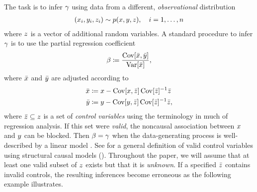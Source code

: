 The task is to infer $\gamma$ using data from a different, \emph{observational} distribution
\begin{align}
\label{eq:dataGeneratingProcess}    
 (x_i, y_i, z_i) \sim p(x, y, z),\quad i=1, \dots, n 
\end{align}
where $z$ is a vector of additional random variables. A standard procedure to infer $\gamma$ is to use the partial regression coefficient
\begin{equation} \label{eq:partial_regression_coeff}
    \begin{split}
    \beta \coloneqq  \frac{\operatorname*{Cov}[\bar{x},  \bar{y}]}{\text{Var}[\bar{x}]},
    \end{split}
\end{equation}
where $\bar{x}$ and $\bar{y}$ are adjusted according to 
\begin{equation}
\begin{split}
     \bar{x} &\coloneqq x - \operatorname*{Cov}[x,  \bar{z}]\operatorname*{Cov}[\bar{z}]^{-1}\bar{z} \\
\bar{y} &\coloneqq y - \operatorname*{Cov}[y,  \bar{z}]\operatorname*{Cov}[\bar{z}]^{-1}\bar{z},
\end{split}
\end{equation}
where $\bar{z} \subseteq z$ is a set of \emph{control variables} using the terminology in much of regression analysis. If this set were \emph{valid}, the noncausal association between $x$ and  $y$ can be blocked. Then $\beta = \gamma$ when the data-generating process is well-described by a linear model \citep{angrist_mostly_2009,pearl_causality:_2009}. See \citep[ch.~6.6]{peters_elements_2017} for a general definition of valid  control variables using structural causal models (\scm). Throughout the paper, we will assume that at least one valid subset of $z$ exists but that it is \emph{unknown}. If a specified $\bar{z}$ contains invalid controls, the resulting inferences become erroneous as the following example illustrates.

